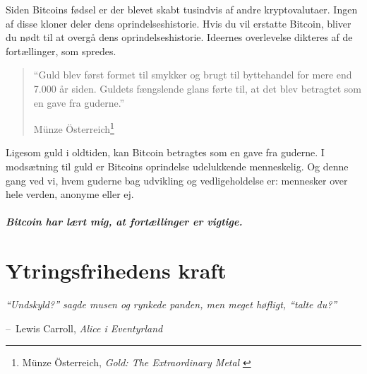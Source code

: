 \documentclass[paper=6in:9in,pagesize=pdftex,headinclude=on,footinclude=on,12pt]{scrbook}
\makeatletter
\newenvironment{chapquote}[2][4em]{\setlength{\@tempdima}{#1}%
   \def\chapquote@author{#2}%
   \parshape 1 \@tempdima \dimexpr\textwidth-2\@tempdima\relax%
   \itshape}{\par\normalfont\hfill--\ \chapquote@author\hspace*{\@tempdima}\par\bigskip}
\makeatother
\begin{document}
\newpage

Siden Bitcoins fødsel er der blevet skabt tusindvis af andre kryptovalutaer. Ingen af disse kloner deler dens oprindelseshistorie. Hvis du vil erstatte Bitcoin, bliver du nødt til at overgå dens oprindelseshistorie. Ideernes overlevelse dikteres af de fortællinger, som spredes.\begin{quotation}\begin{samepage} \enquote{Guld blev først formet til smykker og brugt til byttehandel for mere end 7.000 år siden. Guldets fængslende glans førte til, at det blev betragtet som en gave fra guderne.} \begin{flushright} Münze Österreich\footnote{Münze Österreich, \textit{Gold: The Extraordinary Metal} \cite{gold-gift-gods}}
\end{flushright}\end{samepage}\end{quotation}

Ligesom guld i oldtiden, kan Bitcoin betragtes som en gave fra guderne. I modsætning til guld er Bitcoins oprindelse udelukkende menneskelig. Og denne gang ved vi, hvem guderne bag udvikling og vedligeholdelse er: mennesker over hele verden, anonyme eller ej.\paragraph{Bitcoin har lært mig, at fortællinger er vigtige.}%
%
%
%
%

\chapter{Ytringsfrihedens kraft}
\label{les:6}

\begin{chapquote}{Lewis Carroll, \textit{Alice i Eventyrland}} \enquote{Undskyld?} sagde musen og rynkede panden, men meget høfligt, \enquote{talte du?} \end{chapquote}
\end{document}
